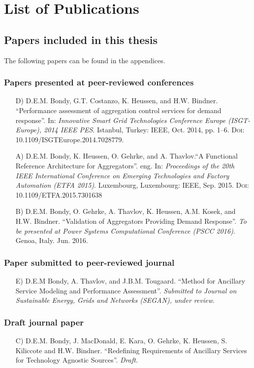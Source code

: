 \chapter{List of Publications}
\section*{Papers included in this thesis}
The following papers can be found in the appendices.
\subsection*{Papers presented at peer-reviewed conferences}
\begin{itemize}
	\item[D)] D.E.M. Bondy, G.T. Costanzo, K. Heussen, and H.W. Bindner. ``Performance assessment of aggregation control services for demand response''. In: \emph{Innovative Smart Grid Technologies Conference Europe (ISGT-Europe), 2014 IEEE PES}. Istanbul, Turkey: IEEE, Oct. 2014, pp. 1–6. \textsc{Doi}: 10.1109/ISGTEurope.2014.7028779.
	\item[A)] D.E.M. Bondy, K. Heussen, O. Gehrke, and A. Thavlov.``A Functional Reference Architecture for Aggregators''. eng. In: \emph{Proceedings of the 20th IEEE International Conference on Emerging Technologies and Factory Automation (ETFA 2015)}. Luxembourg, Luxembourg: IEEE, Sep. 2015. \textsc{Doi}: 10.1109/ETFA.2015.7301638
	\item[B)] D.E.M. Bondy, O. Gehrke, A. Thavlov, K. Heussen, A.M. Kosek, and H.W. Bindner. ``Validation of Aggregators Providing Demand Response''. \emph{To be presented at Power Systems Computational Conference (PSCC 2016)}. Genoa, Italy. Jun. 2016.
\end{itemize}

\subsection*{Paper submitted to peer-reviewed journal}
\begin{itemize}
	\item[E)] D.E.M Bondy, A. Thavlov, and J.B.M. Tougaard. ``Method for Ancillary Service Modeling and Performance Assessment''. \emph{Submitted to Journal on Sustainable Energy, Grids and Networks (SEGAN), under review}.
\end{itemize}

\subsection*{Draft journal paper}
\begin{itemize}
\item[C)] D.E.M. Bondy, J. MacDonald, E. Kara, O. Gehrke, K. Heussen, S. Kiliccote and H.W. Bindner. ``Redefining Requirements of Ancillary Services for Technology Agnostic
	Sources''. \emph{Draft.}
\end{itemize}

